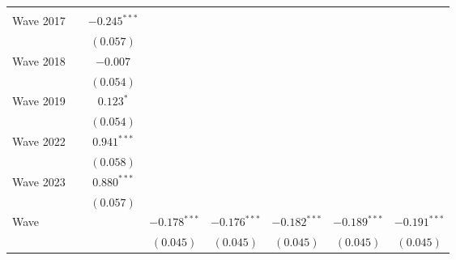 \documentclass[
  12pt,
]{article}
\begin{document}
\begin{table}
\begin{center}
{\begin{tabular}{l c c c c c c c}
                                                      &                &                &                &                &                &                &                \\
\quad Wave 2017                                       &                & $-0.245^{***}$ &                &                &                &                &                \\
                                                      &                & $(0.057)$      &                &                &                &                &                \\
\quad Wave 2018                                       &                & $-0.007$       &                &                &                &                &                \\
                                                      &                & $(0.054)$      &                &                &                &                &                \\
\quad Wave 2019                                       &                & $0.123^{*}$    &                &                &                &                &                \\
                                                      &                & $(0.054)$      &                &                &                &                &                \\
\quad Wave 2022                                       &                & $0.941^{***}$  &                &                &                &                &                \\
                                                      &                & $(0.058)$      &                &                &                &                &                \\
\quad Wave 2023                                       &                & $0.880^{***}$  &                &                &                &                &                \\
                                                      &                & $(0.057)$      &                &                &                &                &                \\
Wave                                                  &                &                & $-0.178^{***}$ & $-0.176^{***}$ & $-0.182^{***}$ & $-0.189^{***}$ & $-0.191^{***}$ \\
                                                      &                &                & $(0.045)$      & $(0.045)$      & $(0.045)$      & $(0.045)$      & $(0.045)$      \\

\end{tabular}}
\end{center}
\end{table}
\end{document}
